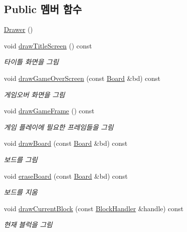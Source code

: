 \subsection*{Public 멤버 함수}
\begin{DoxyCompactItemize}
\item 
\mbox{\hyperlink{class_drawer_a7daabfaadc8a076a71f5f09b0a88f4bb}{Drawer}} ()
\item 
void \mbox{\hyperlink{class_drawer_ad87ca95db3cafee6f005e297e2c6d4de}{draw\+Title\+Screen}} () const
\begin{DoxyCompactList}\small\item\em 타이틀 화면을 그림 \end{DoxyCompactList}\item 
void \mbox{\hyperlink{class_drawer_a57ec099eb46c93f20d9221a2244dd9a7}{draw\+Game\+Over\+Screen}} (const \mbox{\hyperlink{class_board}{Board}} \&bd) const
\begin{DoxyCompactList}\small\item\em 게임오버 화면을 그림 \end{DoxyCompactList}\item 
void \mbox{\hyperlink{class_drawer_a9f5e10f6175710be253244d6f80ebcf7}{draw\+Game\+Frame}} () const
\begin{DoxyCompactList}\small\item\em 게임 플레이에 필요한 프레임들을 그림 \end{DoxyCompactList}\item 
void \mbox{\hyperlink{class_drawer_af26df40487cb2de033887b5342d94b5a}{draw\+Board}} (const \mbox{\hyperlink{class_board}{Board}} \&bd) const
\begin{DoxyCompactList}\small\item\em 보드를 그림 \end{DoxyCompactList}\item 
void \mbox{\hyperlink{class_drawer_ad8b55aff1fbf975536ef3d995d3a4526}{erase\+Board}} (const \mbox{\hyperlink{class_board}{Board}} \&bd) const
\begin{DoxyCompactList}\small\item\em 보드를 지움 \end{DoxyCompactList}\item 
void \mbox{\hyperlink{class_drawer_acef9be5772c0a3bdbae4f01d851e60f1}{draw\+Current\+Block}} (const \mbox{\hyperlink{class_block_handler}{Block\+Handler}} \&handle) const
\begin{DoxyCompactList}\small\item\em 현재 블럭을 그림 \end{DoxyCompactList}\item 

\end{DoxyCompactItemize}
